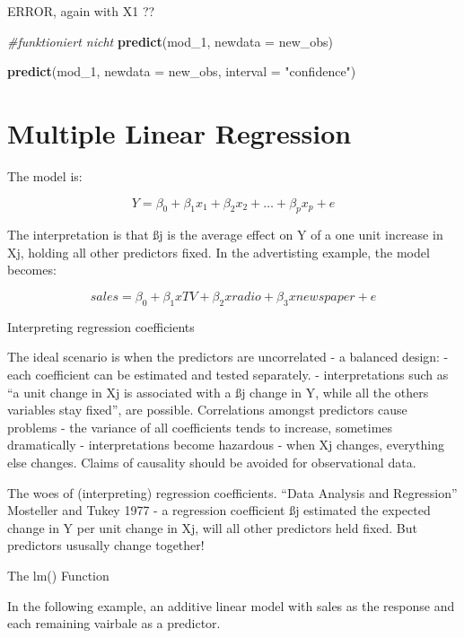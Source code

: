 \documentclass[]{report}
\newenvironment{Shaded}{\begin{snugshade}}{\end{snugshade}}
\newcommand{\KeywordTok}[1]{\textcolor[rgb]{0.13,0.29,0.53}{\textbf{#1}}}
\newcommand{\DataTypeTok}[1]{\textcolor[rgb]{0.13,0.29,0.53}{#1}}
\newcommand{\DecValTok}[1]{\textcolor[rgb]{0.00,0.00,0.81}{#1}}
\newcommand{\StringTok}[1]{\textcolor[rgb]{0.31,0.60,0.02}{#1}}
\newcommand{\CommentTok}[1]{\textcolor[rgb]{0.56,0.35,0.01}{\textit{#1}}}
\newcommand{\NormalTok}[1]{#1}
\begin{document}
ERROR, again with X1 ??

\begin{Shaded}
\begin{Highlighting}[]
\CommentTok{#funktioniert nicht}
\KeywordTok{predict}\NormalTok{(mod_}\DecValTok{1}\NormalTok{, }\DataTypeTok{newdata =}\NormalTok{ new_obs)}

\KeywordTok{predict}\NormalTok{(mod_}\DecValTok{1}\NormalTok{, }\DataTypeTok{newdata =}\NormalTok{ new_obs, }\DataTypeTok{interval =} \StringTok{"confidence"}\NormalTok{)}
\end{Highlighting}
\end{Shaded}

\section{Multiple Linear Regression}\label{multiple-linear-regression}

The model is:

\[Y=\beta_0+\beta_1x_1 +\beta_2x_2+\ldots+\beta_px_p+e\]

The interpretation is that ßj is the average effect on Y of a one unit
increase in Xj, holding all other predictors fixed. In the advertisting
example, the model becomes:

\[sales=\beta_0+\beta_1xTV+\beta_2xradio+\beta_3xnewspaper+e\]

Interpreting regression coefficients

The ideal scenario is when the predictors are uncorrelated - a balanced
design: - each coefficient can be estimated and tested separately. -
interpretations such as ``a unit change in Xj is associated with a ßj
change in Y, while all the others variables stay fixed'', are possible.
Correlations amongst predictors cause problems - the variance of all
coefficients tends to increase, sometimes dramatically - interpretations
become hazardous - when Xj changes, everything else changes. Claims of
causality should be avoided for observational data.

The woes of (interpreting) regression coefficients. ``Data Analysis and
Regression'' Mosteller and Tukey 1977 - a regression coefficient ßj
estimated the expected change in Y per unit change in Xj, will all other
predictors held fixed. But predictors ususally change together!

The lm() Function

In the following example, an additive linear model with sales as the
response and each remaining vairbale as a predictor.
\end{document}
